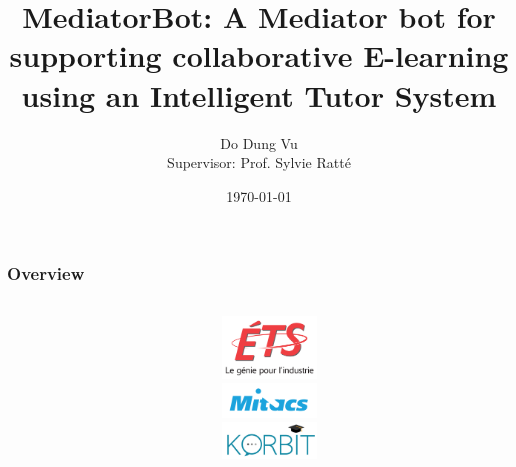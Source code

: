 \documentclass{beamer}
\title[Laboratoire d'ingénierie cognitive et sémantique (LinCS)]{MediatorBot: A Mediator bot for supporting collaborative E-learning using an Intelligent Tutor System} %
\author{Do Dung Vu \\ Supervisor: Prof. Sylvie Ratt\'e} %
\institute[ETS] %
{
Département de génie logiciel et des TI \\ %
\medskip
\textit{do-dung.vu.1@ens.etsmtl.ca } %
}
\date{\today} %
\begin{document}
\begin{frame}
\titlepage %
\end{frame}

\begin{frame}
\frametitle{Overview} %
\begin{columns}
	\begin{column}{.65\textwidth}
\tableofcontents %
\end{column}
	\begin{column}{.35\textwidth}
					\includegraphics[width=25mm]{ETS.png}\\
										\includegraphics[width=25mm]{m2.jpg}\\
															\includegraphics[width=25mm]{korbit.png}
	\end{column}
\end{columns}
\end{frame}


\end{document}
